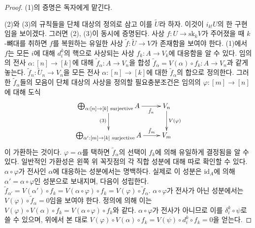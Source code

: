 \begin{proof}
(1)의 증명은 독자에게 맡긴다.

\medskip\noindent
(2)와 (3)의 규칙들을 단체 대상의 정의로 삼고 이를 $\tilde U$라 하자.
이것이 $i_{k!}U$의 한 구현임을 보이겠다. 그러면 (2), (3)이 동시에
증명된다. 사상 $f : U \to \text{sk}_kV$가 주어졌을 때 $k$-뼈대를
취하면 $f$를 복원하는 유일한 사상 $\tilde f : \tilde U \to V$가
존재함을 보여야 한다. (1)에서 $f$는 모든 $i$에 대해 $d^k_i$의 핵으로
사상되는 사상 $f_k : A \to V_k$에 대응함을 알 수 있다.
임의의 전사 $\alpha : [n] \to [k]$에 대해
$\tilde f_\alpha : A \to V_n$을 합성
$\tilde f_\alpha = V(\alpha) \circ f_k : A \to V_n$과 같게 놓는다.
$\tilde f_n : \tilde U_n \to V_n$을 모든 전사
$\alpha : [n] \to [k]$에 대한 $\tilde f_\alpha$의 합으로 정의한다.
그러한 $\tilde f_\alpha$들의 모음이 단체 대상의 사상을 정의할
필요충분조건은 임의의 $\varphi : [m] \to [n]$에 대해 도식
$$
\xymatrix{
\bigoplus_{\alpha : [n] \to [k]\text{ surjective}} A
\ar[r]_-{\tilde f_n}
\ar[d]_{(3)} &
V_n \ar[d]^{V(\varphi)} \\
\bigoplus_{\alpha' : [m] \to [k]\text{ surjective}} A
\ar[r]^-{\tilde f_m} &
V_m
}
$$
이 가환하는 것이다. $\varphi = \alpha$를 택하면 $\tilde f_\alpha$의
선택이 $f_k$에 의해 유일하게 결정됨을 알 수 있다. 일반적인 가환성은
왼쪽 위 꼭짓점의 각 직합 성분에 대해 따로 확인할 수 있다.
$\alpha \circ \varphi$가 전사인 $\alpha$에 대응하는 성분에서는
명백하다. 실제로 이 성분은 $\text{id}_A$에 의해
$\alpha' = \alpha \circ \varphi$인 성분으로 보내지며, 다음이 성립한다.
$\tilde f_{\alpha'} = V(\alpha') \circ f_k =
V(\alpha \circ \varphi) \circ f_k = V(\varphi) \circ \tilde f_\alpha$.
$\alpha \circ \varphi$가 전사가 아닌 성분에서는
$V(\varphi) \circ \tilde f_\alpha = 0$임을 보여야 한다.
정의에 의해 이는
$V(\varphi) \circ V(\alpha) \circ f_k = V(\alpha \circ \varphi) \circ f_k$와
같다. $\alpha \circ \varphi$가 전사가 아니므로 이를
$\delta^k_i \circ \psi$로 쓸 수 있으며, 위에서 본 대로
$V(\varphi) \circ V(\alpha) \circ f_k =
V(\psi) \circ d^k_i \circ f_k = 0$을 얻는다.


\end{proof}
